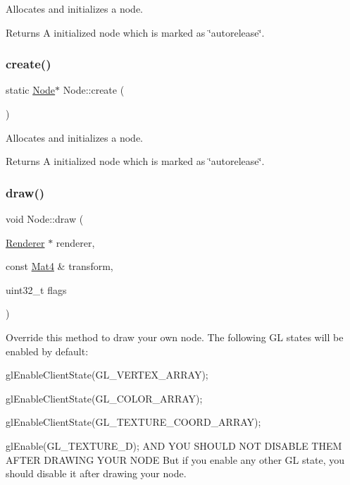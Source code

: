 Allocates and initializes a node. \begin{DoxyReturn}{Returns}
A initialized node which is marked as \char`\"{}autorelease\char`\"{}. 
\end{DoxyReturn}
\mbox{\label{classNode_a8e23ac4cd34aafe7a332b09d8a9de368}} 
\subsubsection{\texorpdfstring{create()}{create()}\hspace{0.1cm}{\footnotesize\ttfamily [2/2]}}
{\footnotesize\ttfamily static \hyperlink{classNode}{Node}$\ast$ Node\+::create (\begin{DoxyParamCaption}{ }\end{DoxyParamCaption})\hspace{0.3cm}{\ttfamily [static]}}

Allocates and initializes a node. \begin{DoxyReturn}{Returns}
A initialized node which is marked as \char`\"{}autorelease\char`\"{}. 
\end{DoxyReturn}
\mbox{\label{classNode_abcf85087a15901deb7c6c1231634c8ab}} 
\subsubsection{\texorpdfstring{draw()}{draw()}\hspace{0.1cm}{\footnotesize\ttfamily [1/2]}}
{\footnotesize\ttfamily void Node\+::draw (\begin{DoxyParamCaption}\item[{\hyperlink{classRenderer}{Renderer} $\ast$}]{renderer,  }\item[{const \hyperlink{classMat4}{Mat4} \&}]{transform,  }\item[{uint32\+\_\+t}]{flags }\end{DoxyParamCaption})\hspace{0.3cm}{\ttfamily [virtual]}}

Override this method to draw your own node. The following GL states will be enabled by default\+:
\begin{DoxyItemize}
\item {\ttfamily gl\+Enable\+Client\+State(\+G\+L\+\_\+\+V\+E\+R\+T\+E\+X\+\_\+\+A\+R\+R\+A\+Y);}
\item {\ttfamily gl\+Enable\+Client\+State(\+G\+L\+\_\+\+C\+O\+L\+O\+R\+\_\+\+A\+R\+R\+A\+Y);}
\item {\ttfamily gl\+Enable\+Client\+State(\+G\+L\+\_\+\+T\+E\+X\+T\+U\+R\+E\+\_\+\+C\+O\+O\+R\+D\+\_\+\+A\+R\+R\+A\+Y);}
\item {\ttfamily gl\+Enable(\+G\+L\+\_\+\+T\+E\+X\+T\+U\+R\+E\+\_\+D);} A\+ND Y\+OU S\+H\+O\+U\+LD N\+OT D\+I\+S\+A\+B\+LE T\+H\+EM A\+F\+T\+ER D\+R\+A\+W\+I\+NG Y\+O\+UR N\+O\+DE But if you enable any other GL state, you should disable it after drawing your node.
\end{DoxyItemize}


